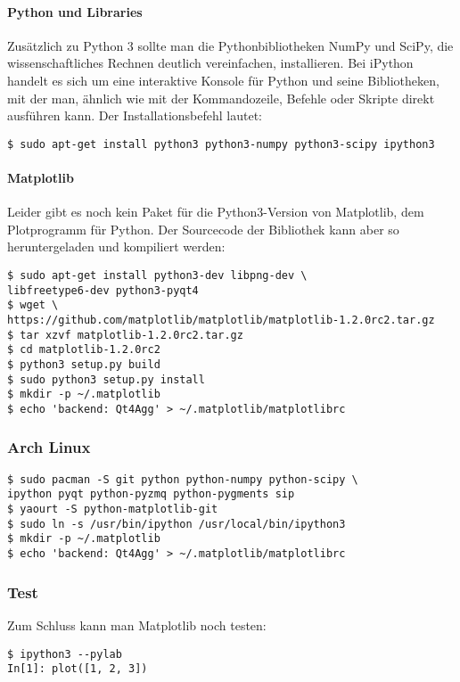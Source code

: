 \paragraph{Python und Libraries}
Zusätzlich zu Python 3 sollte man die Pythonbibliotheken NumPy und SciPy, die wissenschaftliches Rechnen deutlich vereinfachen, installieren.
Bei iPython handelt es sich um eine interaktive Konsole für Python und seine Bibliotheken, mit der man, ähnlich wie mit der Kommandozeile, Befehle oder Skripte direkt ausführen kann.
Der Installationsbefehl lautet:
\begin{verbatim}
$ sudo apt-get install python3 python3-numpy python3-scipy ipython3
\end{verbatim}

\paragraph{Matplotlib}
Leider gibt es noch kein Paket für die Python3-Version von Matplotlib, dem Plotprogramm für Python.
Der Sourcecode der Bibliothek kann aber so heruntergeladen und kompiliert werden:
\begin{verbatim}
$ sudo apt-get install python3-dev libpng-dev \
libfreetype6-dev python3-pyqt4
$ wget \
https://github.com/matplotlib/matplotlib/matplotlib-1.2.0rc2.tar.gz
$ tar xzvf matplotlib-1.2.0rc2.tar.gz
$ cd matplotlib-1.2.0rc2
$ python3 setup.py build
$ sudo python3 setup.py install
$ mkdir -p ~/.matplotlib
$ echo 'backend: Qt4Agg' > ~/.matplotlib/matplotlibrc
\end{verbatim}

\subsubsection{Arch Linux}
\begin{verbatim}
$ sudo pacman -S git python python-numpy python-scipy \
ipython pyqt python-pyzmq python-pygments sip
$ yaourt -S python-matplotlib-git
$ sudo ln -s /usr/bin/ipython /usr/local/bin/ipython3
$ mkdir -p ~/.matplotlib
$ echo 'backend: Qt4Agg' > ~/.matplotlib/matplotlibrc
\end{verbatim}

\subsubsection{Test}
Zum Schluss kann man Matplotlib noch testen:
\begin{verbatim}
$ ipython3 --pylab
In[1]: plot([1, 2, 3])
\end{verbatim}
